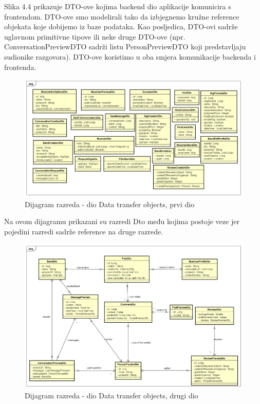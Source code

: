 			Slika 4.4 prikazuje DTO-ove kojima backend dio aplikacije komunicira s frontendom. DTO-ove smo modelirali tako da izbjegnemo kružne reference objekata koje dobijemo iz baze podataka. Kao posljedica, DTO-ovi sadrže uglavnom primitivne tipove ili neke druge DTO-ove (npr. ConversationPreviewDTO sadrži listu PersonPreviewDTO koji predstavljaju sudionike razgovora). DTO-ove koristimo u oba smjera komunikacije backenda i frontenda.
			
			
			\begin{figure}[H]
				\begin{center}
					\includegraphics[width=17cm]{slike/nepovezani_dto.PNG}
				\end{center}
				\caption{Dijagram razreda - dio Data transfer objects, prvi dio}
				\label{fig:dto}
			\end{figure}
		
		Na ovom dijagramu prikazani su razredi Dto među kojima postoje veze jer pojedini razredi sadrže reference na druge razrede. 
		
		\begin{figure}[H]
			\begin{center}
				\includegraphics[width=17cm]{slike/povezani_dto.PNG}
			\end{center}
			\caption{Dijagram razreda - dio Data transfer objects, drugi dio}
			\label{fig:dto2}
		\end{figure}
		
